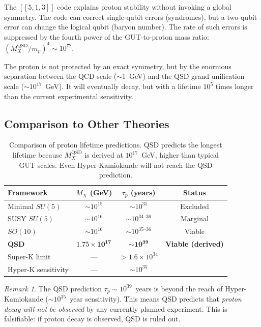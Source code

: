 \documentclass[11pt,a4paper]{article}
\theoremstyle{definition}
\theoremstyle{remark}
\newtheorem{remark}[theorem]{Remark}
\newcommand{\MX}{{M_X^{\mathrm{QSD}}}}
\begin{document}
The $[[5,1,3]]$ code explains proton stability without invoking a global symmetry. The code can correct single-qubit errors (syndromes), but a two-qubit error can change the logical qubit (baryon number). The rate of such errors is suppressed by the fourth power of the GUT-to-proton mass ratio: $(\MX/m_p)^4 \sim 10^{72}$.

The proton is not protected by an exact symmetry, but by the enormous separation between the QCD scale ($\sim$1~GeV) and the QSD grand unification scale ($\sim 10^{17}$~GeV). It will eventually decay, but with a lifetime $10^5$ times longer than the current experimental sensitivity.

\subsection{Comparison to Other Theories}

\begin{table}[H]
\centering
\begin{tabular}{lccc}
\toprule
\textbf{Framework} & \textbf{$M_X$ (GeV)} & \textbf{$\tau_p$ (years)} & \textbf{Status} \\
\midrule
Minimal $SU(5)$ & $\sim 10^{15}$ & $\sim 10^{31}$ & Excluded \\
SUSY $SU(5)$ & $\sim 10^{16}$ & $\sim 10^{34\text{--}36}$ & Marginal \\
$SO(10)$ & $\sim 10^{16}$ & $\sim 10^{35\text{--}36}$ & Viable \\
\textbf{QSD} & $\mathbf{1.75 \times 10^{17}}$ & $\mathbf{\sim 10^{39}}$ & \textbf{Viable (derived)} \\
\midrule
Super-K limit & --- & $> 1.6 \times 10^{34}$ & \cite{SuperK2020} \\
Hyper-K sensitivity & --- & $\sim 10^{35}$ & \cite{HyperK2018} \\
\bottomrule
\end{tabular}
\caption{Comparison of proton lifetime predictions. QSD predicts the longest lifetime because $\MX$ is derived at $10^{17}$~GeV, higher than typical GUT scales. Even Hyper-Kamiokande will not reach the QSD prediction.}
\label{tab:compare_proton}
\end{table}

\begin{remark}
The QSD prediction $\tau_p \sim 10^{39}$~years is beyond the reach of Hyper-Kamiokande ($\sim 10^{35}$~year sensitivity). This means QSD predicts that \emph{proton decay will not be observed} by any currently planned experiment. This is falsifiable: if proton decay is observed, QSD is ruled out.
\end{remark}
\end{document}
